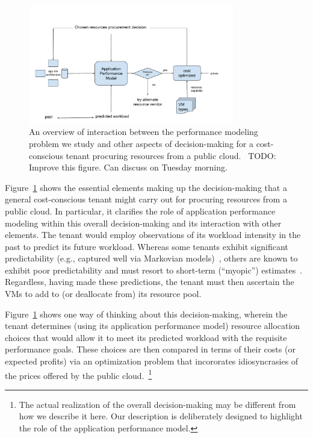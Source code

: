 \documentclass{acm_proc_article-sp}
\newcommand{\bu}[1]{{\color{blue}#1}}
\begin{document}
\begin{figure}%
\centering
\includegraphics[width=0.8\textwidth]{pmass_diagram}
\caption{An overview of interaction between the performance modeling problem we study and other aspects of decision-making for a cost-conscious tenant procuring resources from a public cloud. ~\bu{TODO: Improve this figure. Can discuss on Tuesday morning.}} 
\label{fig:diagram}
\end{figure}

Figure~\ref{fig:diagram} shows the essential elements making up the decision-making that a general cost-conscious tenant might carry out for procuring resources from a public cloud. In particular, it clarifies the role of application performance modeling within this overall decision-making and its interaction with other elements. 
The tenant would employ observations of its workload intensity in the past to predict its future workload. Whereas some tenants exhibit significant predictability (e.g., captured well via Markovian models)~\cite{xxx}, others are known to exhibit poor predictability and must resort to short-term (``myopic'') estimates~\cite{xxx}. Regardless, having made these predictions, the tenant must then ascertain the VMs to add to (or deallocate from) its resource pool. 

Figure~\ref{fig:diagram} shows one way of thinking about this decision-making, wherein the tenant determines (using its application performance model) resource allocation choices that would allow it to meet its predicted workload with the requisite performance goals. These choices are then compared in terms of their costs (or expected profits) via an optimization problem that incororates idiosyncrasies of the prices offered by the public cloud.~\footnote{The actual realization of the overall decision-making may be different from how we describe it here. Our description is deliberately designed to highlight the role of the application performance model.} 
\end{document}
